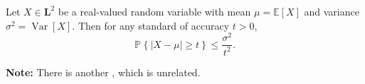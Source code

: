 \documentclass[12pt]{article}
\newcommand{\Prob}[2]{\mathbb{P}_{#1}\left\{#2\right\}}
\begin{document}
Let $ X\in \textbf{L}^2$ be a real-valued random variable with mean $ \mu=\mathbb{E}[X]$ and variance $ \sigma^2=\operatorname{Var} [X]$.   Then for any standard of accuracy $t>0$,
$$
\Prob{}{\left| X - \mu \right| \ge t} \le \frac{\sigma^2}{t^2}.
$$

\textbf{Note:} There is another , which is unrelated.
\end{document}
